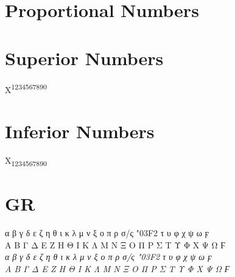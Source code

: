 \documentclass[a4paper]{article}
\begin{document}

\section*{Proportional Numbers}


\section*{Superior Numbers}

X\textsuperscript{1234567890}

\section*{Inferior Numbers}

X\textsubscript{1234567890}

\section*{GR}

 α β γ δ ε ζ η θ ι κ λ μ ν ξ ο π ρ σ/ς {\char"03F2} τ υ φ χ ψ ω ϝ \\
 Α Β Γ Δ Ε Ζ Η Θ Ι Κ Λ Μ Ν Ξ Ο Π Ρ Σ Τ Υ Φ Χ Ψ Ω Ϝ\\
 \emph{α β γ δ ε ζ η θ ι κ λ μ ν ξ ο π ρ σ/ς {\char"03F2} τ υ φ χ ψ ω ϝ \\
 Α Β Γ Δ Ε Ζ Η Θ Ι Κ Λ Μ Ν Ξ Ο Π Ρ Σ Τ Υ Φ Χ Ψ Ω Ϝ}\par
\end{document}
